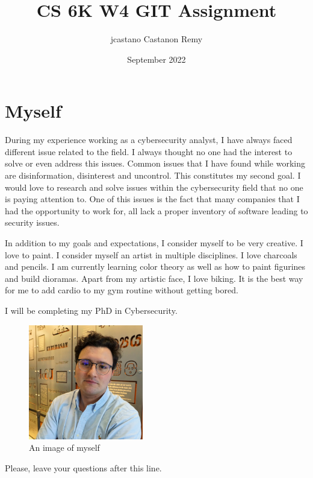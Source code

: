 \documentclass{article}
\title{CS 6K W4 GIT Assignment}
\author{jcastano Castanon Remy}
\date{September 2022}
\begin{document}
\maketitle

\section{Myself}

During my experience working as a cybersecurity analyst, I have always faced different issue related to the field. I always thought no one had the interest to solve or even address this issues. Common issues that I have found while working are disinformation, disinterest and uncontrol. This constitutes my second goal. I would love to research and solve issues within the cybersecurity field that no one is paying attention to. One of this issues is the fact that many companies that I had the opportunity to work for, all lack a proper inventory of software leading to security issues.



In addition to my goals and expectations, I consider myself to be very creative. I love to paint. I consider myself an artist in multiple disciplines. I love charcoals and pencils. I am currently learning color theory as well as how to paint figurines and build dioramas. Apart from my artistic face, I love biking. It is the best way for me to add cardio to my gym routine without getting bored.

I will be completing my PhD in Cybersecurity.


\begin{figure}[htp]
    \centering
    \includegraphics[width=5cm]{UCCSProfileIMG.jpg}
    \caption{An image of myself}
    \label{fig:myself}
\end{figure}


Please, leave your questions after this line.
\end{document}
